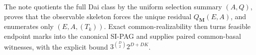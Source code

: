 The note quotients the full Dai class by the uniform selection summary \((A,Q)\), proves that the observable skeleton forces the unique residual \(Q_{\mathbf M}(E,A)\), and enumerates only \((E,A,(T_k))\).  Exact common-realizability then turns feasible endpoint marks into the canonical SI-PAG and supplies paired common-basal witnesses, with the explicit bound \(3^{\binom D2}2^{D+DK}\).